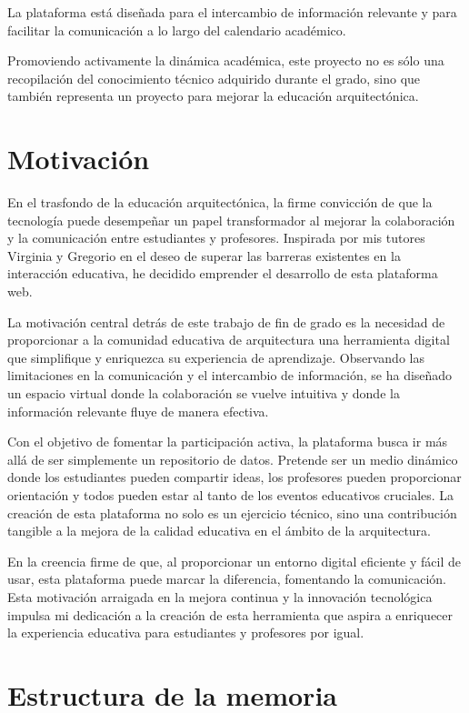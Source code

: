 \documentclass[a4paper, 12pt]{book}
\begin{document}
La plataforma está diseñada para el intercambio de información relevante y para facilitar la comunicación a 
lo largo del calendario académico.

Promoviendo activamente la dinámica académica, este proyecto no es sólo una recopilación del conocimiento técnico adquirido durante 
el grado, sino que también representa un proyecto para mejorar la educación arquitectónica. 
\section{Motivación}
\label{sec:seccion}

En el trasfondo de la educación arquitectónica, la firme convicción de que la tecnología puede desempeñar un papel transformador al mejorar la colaboración y la comunicación entre estudiantes y profesores. Inspirada por mis tutores Virginia y Gregorio en el deseo de superar las barreras existentes en la interacción educativa, he decidido emprender el desarrollo de esta plataforma web.

La motivación central detrás de este trabajo de fin de grado es la necesidad de proporcionar a la comunidad educativa de arquitectura una herramienta digital que simplifique y enriquezca su experiencia de aprendizaje. Observando las limitaciones en la comunicación y el intercambio de información, se ha diseñado un espacio virtual donde la colaboración se vuelve intuitiva y donde la información relevante fluye de manera efectiva.

Con el objetivo de fomentar la participación activa, la plataforma busca ir más allá de ser simplemente un repositorio de datos. Pretende ser un medio dinámico donde los estudiantes pueden compartir ideas, los profesores pueden proporcionar orientación y todos pueden estar al tanto de los eventos educativos cruciales. La creación de esta plataforma no solo es un ejercicio técnico, sino una contribución tangible a la mejora de la calidad educativa en el ámbito de la arquitectura.

En la creencia firme de que, al proporcionar un entorno digital eficiente y fácil de usar, esta plataforma puede marcar la diferencia, fomentando la comunicación. Esta motivación arraigada en la mejora continua y la innovación tecnológica impulsa mi dedicación a la creación de esta herramienta que aspira a enriquecer la experiencia educativa para estudiantes y profesores por igual.

\section{Estructura de la memoria}
\label{sec:seccion}
\end{document}

